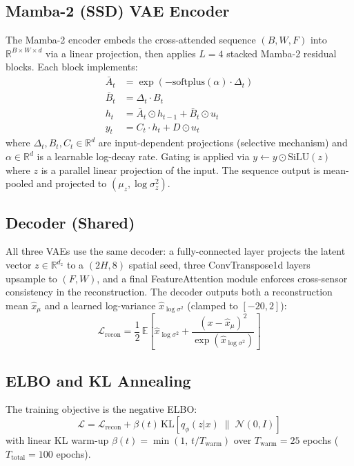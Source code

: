 \documentclass[10pt,twocolumn]{article}
\begin{document}
\subsection{Mamba-2 (SSD) VAE Encoder}

The Mamba-2 encoder embeds the cross-attended sequence $(B, W, F)$ into
$\mathbb{R}^{B \times W \times d}$ via a linear projection, then applies $L = 4$
stacked Mamba-2 residual blocks. Each block implements:
\begin{align}
  \bar{A}_t &= \exp\!\left(-\text{softplus}(\alpha) \cdot \Delta_t\right) \\
  \bar{B}_t &= \Delta_t \cdot B_t \\
  h_t       &= \bar{A}_t \odot h_{t-1} + \bar{B}_t \odot u_t \\
  y_t       &= C_t \cdot h_t + D \odot u_t
\end{align}
where $\Delta_t, B_t, C_t \in \mathbb{R}^{d}$ are input-dependent projections
(selective mechanism) and $\alpha \in \mathbb{R}^d$ is a learnable log-decay rate.
Gating is applied via $y \leftarrow y \odot \text{SiLU}(z)$ where $z$ is a
parallel linear projection of the input. The sequence output is mean-pooled and
projected to $(\mu_z, \log\sigma_z^2)$.

\subsection{Decoder (Shared)}

All three VAEs use the same decoder: a fully-connected layer projects the latent
vector $z \in \mathbb{R}^{d_z}$ to a $(2H, 8)$ spatial seed, three
ConvTranspose1d layers upsample to $(F, W)$, and a final FeatureAttention
module enforces cross-sensor consistency in the reconstruction. The decoder
outputs both a reconstruction mean $\hat{x}_\mu$ and a learned log-variance
$\hat{x}_{\log\sigma^2}$ (clamped to $[-20, 2]$):
\begin{equation}
  \mathcal{L}_{\text{recon}} = \frac{1}{2}\,\mathbb{E}\!\left[
    \hat{x}_{\log\sigma^2} + \frac{(x - \hat{x}_\mu)^2}{\exp(\hat{x}_{\log\sigma^2})}
  \right]
\end{equation}

\subsection{ELBO and KL Annealing}

The training objective is the negative ELBO:
\begin{equation}
  \mathcal{L} = \mathcal{L}_{\text{recon}} + \beta(t)\,\text{KL}\!\left[
    q_\phi(z|x) \;\|\; \mathcal{N}(0, I)
  \right]
\end{equation}
with linear KL warm-up $\beta(t) = \min\!\left(1,\, t / T_{\text{warm}}\right)$
over $T_{\text{warm}} = 25$ epochs ($T_{\text{total}} = 100$ epochs).
\end{document}
